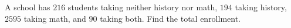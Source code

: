 A school has $216$ students taking neither history nor math, $194$ taking history, $2595$ taking math, and $90$ taking both. Find the total enrollment.
